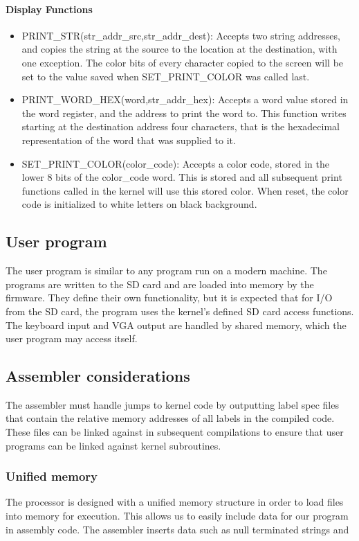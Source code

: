 \documentclass[../ProjectDocumentation.tex]{subfiles}
\begin{document}
\paragraph{Display Functions}
\begin{itemize}
\item PRINT\_STR(str\_addr\_src,str\_addr\_dest):
	Accepts two string addresses, and copies the string at the source to the location at the destination, with one exception. The color bits of every character copied to the screen will be set to the value saved when SET\_PRINT\_COLOR was called last.
\item PRINT\_WORD\_HEX(word,str\_addr\_hex):
	Accepts a word value stored in the word register, and the address to print the word to. This function writes starting at the destination address four characters, that is the hexadecimal representation of the word that was supplied to it.
\item SET\_PRINT\_COLOR(color\_code):
	Accepts a color code, stored in the lower 8 bits of the color\_code word. This is stored and all subsequent print functions called in the kernel will use this stored color. When reset, the color code is initialized to white letters on black background.
\end{itemize}
\subsection{User program}
The user program is similar to any program run on a modern machine. The programs are written to the SD card and are loaded into memory by the firmware. They define their own functionality, but it is expected that for I/O from the SD card, the program uses the kernel's defined SD card access functions. The keyboard input and VGA output are handled by shared memory, which the user program may access itself.

\subsection{Assembler considerations}
The assembler must handle jumps to kernel code by outputting label spec files that contain the relative memory addresses of all labels in the compiled code. These files can be linked against in subsequent compilations to ensure that user programs can be linked against kernel subroutines.
\subsubsection{Unified memory}
The processor is designed with a unified memory structure in order to load files into memory for execution. This allows us to easily include data for our program in assembly code. The assembler inserts data such as null terminated strings and 
\end{document}
